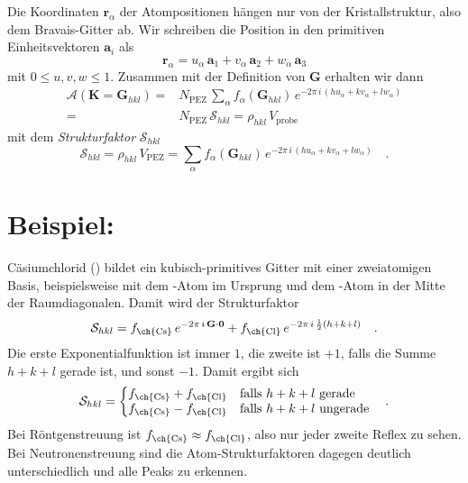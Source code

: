 Die Koordinaten  $\mathbf{r}_\alpha$  der Atompositionen hängen nur von der Kristallstruktur, also dem Bravais-Gitter ab. Wir schreiben die Position in den primitiven Einheitsvektoren $\mathbf{a}_i$ als
\begin{equation}
\mathbf{r}_\alpha = u_\alpha \, \mathbf{a}_1 + v_\alpha \, \mathbf{a}_2 + w_\alpha \, \mathbf{a}_3
\end{equation}
mit $0 \le u,v,w \le 1$. Zusammen mit der Definition von  $ \mathbf{G}$ erhalten wir dann 
\begin{align}
\mathcal{A}(\mathbf{K} = \mathbf{G}_{hkl} ) 
 = &
  N_\text{PEZ}  \, 
\sum_\alpha f_\alpha ( \mathbf{G}_{hkl} ) \, e^{-2 \pi \, i \, ( h u_\alpha + k v_\alpha + l w_\alpha  ) } \\
 = &
 N_\text{PEZ} \, \mathcal{S}_{hkl} = \rho_{hkl} \, V_\text{probe} 
\end{align}
mit dem \emph{Strukturfaktor} $\mathcal{S}_{hkl} $
\begin{equation}
  \mathcal{S}_{hkl} =  \rho_{hkl} \, V_\text{PEZ}  = \sum_\alpha f_\alpha ( \mathbf{G}_{hkl} ) \, e^{-2 \pi \, i \, ( h u_\alpha + k v_\alpha + l w_\alpha  ) }  \quad .
\end{equation}


\section{Beispiel: }

Cäsiumchlorid  () bildet ein kubisch-primitives Gitter mit einer zweiatomigen Basis, beispielsweise mit dem -Atom im Ursprung und dem -Atom in der Mitte der Raumdiagonalen. Damit wird der Strukturfaktor 
\begin{equation}
\mathcal{S}_{hkl} = f_\text{\ch{Cs}} \, e^{-2 \pi \, i  \, \mathbf{G} \cdot \mathbf{0}} + f_\text{\ch{Cl}} \, e^{- 2 \pi  \, i \, \frac{1}{2}(h + k + l) }   \quad .
\end{equation}
Die erste Exponentialfunktion ist immer $1$, die zweite ist $+1$, falls die Summe $h + k + l$ gerade ist, und sonst $-1$. Damit ergibt sich
\begin{equation}
  \mathcal{S}_{hkl} = \left\{
  \begin{array}{@{}ll@{}}
    f_\text{\ch{Cs}}  + f_\text{\ch{Cl}}  &\text{falls}\  h+k+l \ \text{gerade} \\
     f_\text{\ch{Cs}}  - f_\text{\ch{Cl}} & \text{falls}\  h+k+l \ \text{ungerade} \\
  \end{array}\right.  \quad .
\end{equation} 
Bei Röntgenstreuung ist $  f_\text{\ch{Cs}}  \approx f_\text{\ch{Cl}}$, also nur jeder zweite Reflex zu sehen. Bei Neutronenstreuung sind die Atom-Strukturfaktoren dagegen deutlich unterschiedlich und alle Peaks zu erkennen.



